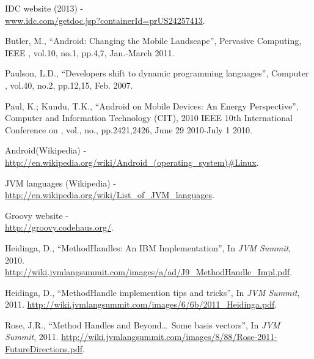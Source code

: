 \documentclass{sig-alternate}
\def \ANDROID{Android\xspace}
\def \JVM{JVM\xspace}
\begin{document}
\makeatletter
  \def\@seccntformat#1{Appendix~\csname the#1\endcsname:\quad}
\makeatother

% 


\begin{thebibliography}{}

  IDC website (2013) - \\ \url{www.idc.com/getdoc.jsp?containerId=prUS24257413}.

  Butler, M., ``Android: Changing the Mobile Landscape'', Pervasive Computing, IEEE , vol.10, no.1, pp.4,7, Jan.-March 2011.

  Paulson, L.D., ``Developers shift to dynamic programming languages'', Computer , vol.40, no.2, pp.12,15, Feb. 2007.

  Paul, K.; Kundu, T.K., ``Android on Mobile Devices: An Energy Perspective'', Computer and Information Technology (CIT), 2010 IEEE 10th International Conference on , vol., no., pp.2421,2426, June 29 2010-July 1 2010.

  \ANDROID (Wikipedia) - \\ \url{http://en.wikipedia.org/wiki/Android\_(operating\_system)#Linux}.

  \JVM languages (Wikipedia) - \\ \url{http://en.wikipedia.org/wiki/List\_of\_JVM\_languages}.

  Groovy website - \\ \url{http://groovy.codehaus.org/}.
  
  Heidinga, D., ``MethodHandles: An IBM Implementation'', In {\it JVM Summit}, 2010. \url{http://wiki.jvmlangsummit.com/images/a/ad/J9_MethodHandle_Impl.pdf}.

  Heidinga, D., ``MethodHandle implemention tips and tricks'', In {\it JVM Summit}, 2011. \url{http://wiki.jvmlangsummit.com/images/6/6b/2011_Heidinga.pdf}.

  Rose, J.R., ``Method Handles and Beyond\dots~Some basis vectors'', In {\it JVM Summit}, 2011. \url{http://wiki.jvmlangsummit.com/images/8/88/Rose-2011-FutureDirections.pdf}.


\end{thebibliography}
\end{document}
